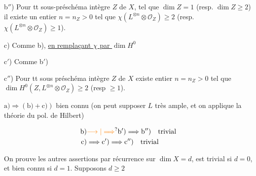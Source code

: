 b$''$) Pour tt sous-préschéma intègre $Z$ de $X$, tel que $\dim Z=1$ (resp. $\dim Z\geq2$) il existe un entier $n=n_Z>0$ tel que $\chi(L^{\otimes n}\otimes\mathcal O_Z)\geq2$ (resp. $\chi(L^{\otimes n}\otimes\mathcal O_Z)\geq1$).

c) Comme b), \uline{en remplaçant $\chi$ par  $\dim H^0$}

c$'$) Comme b$'$)

c$''$) Pour tt sous préschéma intègre $Z$ de $X$  existe  entier $n=n_Z>0$ tel que $\dim H^0(Z,L^{\otimes n}\otimes\mathcal O_Z)\geq2$ (resp $\geq1$).




$\mathrm{a)}\Longrightarrow(\mathrm{b)}+\mathrm{c)})$ bien connu (on peut supposer $L$ très ample, et on applique la théorie du pol. de Hilbert)

\[
\begin{aligned}
\mathrm{b)}&\unsure{\longrightarrow|\Longrightarrow}\mathrm{b}')\Longrightarrow\mathrm{b}'')\quad\text{trivial}\\
\mathrm{c)}&\Longrightarrow\mathrm{c}')\Longrightarrow\mathrm{c}'')\quad\text{trivial}
\end{aligned}
\]

On prouve les autres assertions par récurrence sur  $\dim X=d$,  est trivial si $d=0$, et bien connu  si $d=1$. Supposons $d\geq2$

